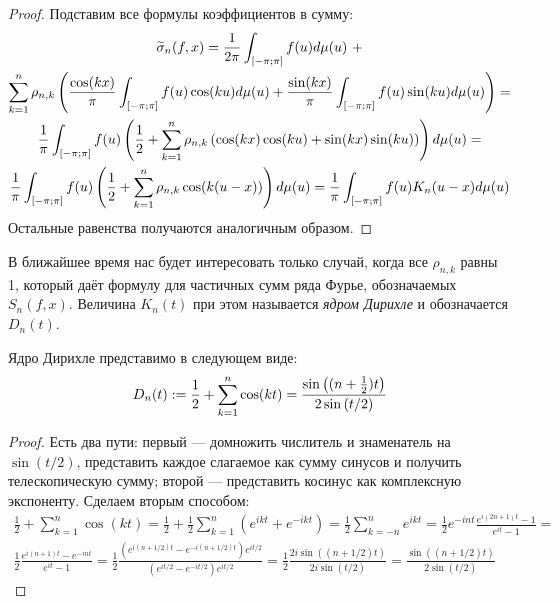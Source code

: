 \begin{proof}
	Подставим все формулы коэффициентов в сумму:
	\begin{multline*}
		\widetilde\sigma_n(f, x) = \frac{1}{2\pi}\int_{[-\pi; \pi]} f(u)d\mu(u) \ +
		\\
		\sum_{k = 1}^n \rho_{n,k} \left(\frac{\cos(kx)}{\pi}\int_{[-\pi; \pi]} f(u)\cos(ku)d\mu(u) + \frac{\sin(kx)}{\pi}\int_{[-\pi; \pi]} f(u)\sin(ku)d\mu(u)\right) =
		\\
		\frac{1}{\pi} \int_{[-\pi; \pi]} f(u)\left(\frac{1}{2} + \sum_{k = 1}^n \rho_{n,k} \left(\cos(kx)\cos(ku) + \sin(kx)\sin(ku)\right)\right)d\mu(u) =
		\\
		\frac{1}{\pi} \int_{[-\pi; \pi]} f(u)\left(\frac{1}{2} + \sum_{k = 1}^n \rho_{n,k} \cos(k(u - x))\right)d\mu(u) = \frac{1}{\pi} \int_{[-\pi; \pi]} f(u)K_n(u - x)d\mu(u)
	\end{multline*}
	Остальные равенства получаются аналогичным образом.
\end{proof}

\begin{note}
	В ближайшее время нас будет интересовать только случай, когда все $\rho_{n,k}$ равны 1, который даёт формулу для частичных сумм ряда Фурье, обозначаемых $S_n(f, x)$. Величина $K_n(t)$ при этом называется \textit{ядром Дирихле} и обозначается $D_n(t)$.
\end{note}

\begin{lemma}
	Ядро Дирихле представимо в следующем виде:
	\[
		D_n(t) := \frac{1}{2} + \sum_{k = 1}^n \cos(kt) = \frac{\sin\left((n + \frac{1}{2})t\right)}{2\sin\left(t/2\right)}
	\]
\end{lemma}

\begin{proof}
	Есть два пути: первый --- домножить числитель и знаменатель на $\sin(t/2)$, представить каждое слагаемое как сумму синусов и получить телескопическую сумму; второй --- представить косинус как комплексную экспоненту. Сделаем вторым способом:
	\begin{multline*}
		\frac{1}{2} + \sum_{k = 1}^n \cos(kt) = \frac{1}{2} + \frac{1}{2}\sum_{k = 1}^n (e^{ikt} + e^{-ikt}) = \frac{1}{2} \sum_{k = -n}^n e^{ikt} = \frac{1}{2} e^{-int} \frac{e^{i(2n + 1)t} - 1}{e^{it} - 1} = \\
		\frac{1}{2} \frac{e^{i(n + 1)t} - e^{-int}}{e^{it} - 1} = \frac{1}{2}\frac{(e^{i(n + 1/2)t} - e^{-i(n + 1/2)t})e^{it/2}}{(e^{it/2} - e^{-it/2})e^{it/2}} = \frac{1}{2}\frac{2i\sin((n + 1/2)t)}{2i\sin(t/2)} = \frac{\sin((n + 1/2)t)}{2\sin(t/2)}
	\end{multline*}
\end{proof}

